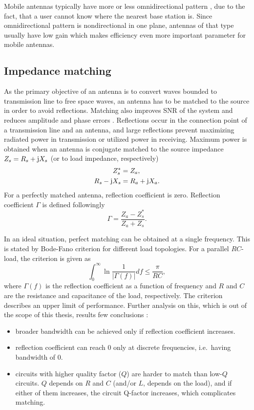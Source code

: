 Mobile antennas typically have more or less omnidirectional pattern \cite{ying_mobile_antennas}, due to the fact, that a user cannot know where the nearest base station is. Since omnidirectional pattern is nondirectional in one plane, antennas of that type usually have low gain which makes efficiency even more important parameter for mobile antennas.

\subsection{Impedance matching}
\label{sec:matching}
As the primary objective of an antenna is to convert waves bounded to transmission line to free space waves, an antenna has to be matched to the source in order to avoid reflections. Matching also improves SNR of the system and reduces amplitude and phase errors \cite{pozar}. Reflections occur in the connection point of a transmission line and an antenna, and large reflections prevent maximizing radiated power in transmission or utilized power in receiving. Maximum power is obtained when an antenna is conjugate matched \cite{stutzman} to the source impedance $Z_s=R_s+\mathrm{j} X_s$ (or to load impedance, respectively)
\begin{align}
\label{eq:matching1}
    Z_s^* &= Z_a,\\
\label{eq:matching2}
    R_s-\mathrm{j} X_s &= R_a+\mathrm{j} X_a.
\end{align}
For a perfectly matched antenna, reflection coefficient is zero. Reflection coefficient $\Gamma$ \cite{stutzman} is defined followingly
\begin{equation}
\label{eq:reflection_coeff}
    \Gamma = \frac{Z_a-Z_s^*}{Z_a+Z_s}.
\end{equation}

In an ideal situation, perfect matching can be obtained at a single frequency. This is stated by Bode-Fano criterion for different load topologies. For a parallel $RC$-load, the criterion \cite{pozar} is given as
\begin{equation}
    \int_0^\infty\ln\frac{1}{|\Gamma(f)|}df\leq\frac{\pi}{RC},
\end{equation}
where $\Gamma(f)$ is the reflection coefficient as a function of frequency and $R$ and $C$ are the resistance and capacitance of the load, respectively. The criterion describes an upper limit of performance. Further analysis on this, which is out of the scope of this thesis, results few conclusions \cite{pozar}:
\begin{itemize}
    \item broader bandwidth can be achieved only if reflection coefficient increases.
    \item reflection coefficient can reach 0 only at discrete frequencies, i.e.\ having bandwidth of 0.
    \item circuits with higher quality factor ($Q$) are harder to match than low-$Q$ circuits. $Q$ depends on $R$ and $C$ (and/or $L$, depends on the load), and if either of them increases, the circuit Q-factor increases, which complicates matching.
\end{itemize}

